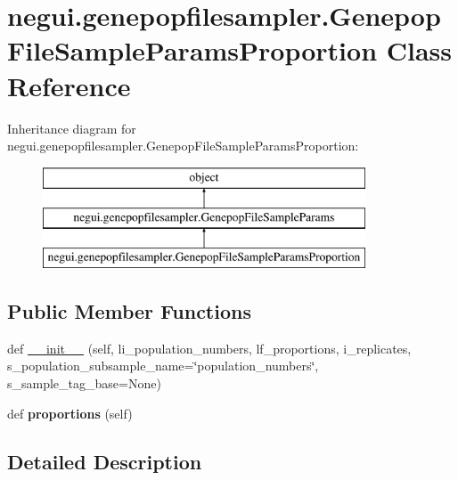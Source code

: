 \hypertarget{classnegui_1_1genepopfilesampler_1_1GenepopFileSampleParamsProportion}{}\section{negui.\+genepopfilesampler.\+Genepop\+File\+Sample\+Params\+Proportion Class Reference}
\label{classnegui_1_1genepopfilesampler_1_1GenepopFileSampleParamsProportion}
Inheritance diagram for negui.\+genepopfilesampler.\+Genepop\+File\+Sample\+Params\+Proportion\+:\begin{figure}[H]
\begin{center}
\leavevmode
\includegraphics[height=3.000000cm]{classnegui_1_1genepopfilesampler_1_1GenepopFileSampleParamsProportion}
\end{center}
\end{figure}
\subsection*{Public Member Functions}
\begin{DoxyCompactItemize}
\item 
def \hyperlink{classnegui_1_1genepopfilesampler_1_1GenepopFileSampleParamsProportion_ab75eceef987c513501a5d55fb7ef3f7b}{\+\_\+\+\_\+init\+\_\+\+\_\+} (self, li\+\_\+population\+\_\+numbers, lf\+\_\+proportions, i\+\_\+replicates, s\+\_\+population\+\_\+subsample\+\_\+name=\char`\"{}population\+\_\+numbers\char`\"{}, s\+\_\+sample\+\_\+tag\+\_\+base=None)
\item 
def {\bfseries proportions} (self)\hypertarget{classnegui_1_1genepopfilesampler_1_1GenepopFileSampleParamsProportion_a0b564f11df13b230af1cb7a86e1376e1}{}\label{classnegui_1_1genepopfilesampler_1_1GenepopFileSampleParamsProportion_a0b564f11df13b230af1cb7a86e1376e1}

\end{DoxyCompactItemize}


\subsection{Detailed Description}


